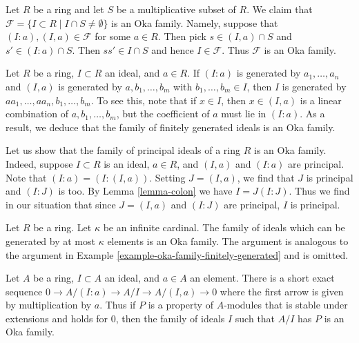 \begin{example}
\label{example-oka-family-not-meet-multiplicative-set}
Let $R$ be a ring and let $S$ be a multiplicative subset of $R$.
We claim that $\mathcal{F} = \{I \subset R \mid I \cap S \not = \emptyset\}$
is an Oka family. Namely, suppose that $(I : a), (I, a) \in \mathcal{F}$
for some $a \in R$. Then pick $s \in (I, a) \cap S$ and
$s' \in (I : a) \cap S$. Then $ss' \in I \cap S$ and hence
$I \in \mathcal{F}$. Thus $\mathcal{F}$ is an Oka family.
\end{example}

\begin{example}
\label{example-oka-family-finitely-generated}
Let $R$ be a ring, $I \subset R$ an ideal, and $a \in R$.
If $(I : a)$ is generated by $a_1, \ldots, a_n$ and $(I, a)$
is generated by $a, b_1, \ldots, b_m$ with
$b_1, \ldots, b_m \in I$, then $I$ is generated by
$aa_1, \ldots, aa_n, b_1, \ldots, b_m$.
To see this, note that if $x \in I$, then $x \in (I, a)$
is a linear combination of $a, b_1, \ldots, b_m$, but the
coefficient of $a$ must lie in $(I:a)$.
As a result, we deduce that
the family of finitely generated ideals is an Oka family.
\end{example}

\begin{example}
\label{example-oka-family-principal}
Let us show that the family of principal ideals of a ring $R$ is an Oka family.
Indeed, suppose $I \subset R$ is an ideal, $a \in R$, and $(I, a)$ and
$(I : a)$ are principal. Note that $(I : a) = (I : (I, a))$.
Setting $J = (I, a)$, we find that $J$ is principal and $(I : J)$ is too. By
Lemma \ref{lemma-colon}
we have $I = J (I : J)$.
Thus we find in our situation that since $J = (I, a)$ and $(I : J)$
are principal, $I$ is principal.
\end{example}

\begin{example}
\label{example-oka-family-bound-cardinality}
Let $R$ be a ring.
Let $\kappa$ be an infinite cardinal.
The family of ideals which can be generated by at most $\kappa$ elements
is an Oka family. The argument is analogous to the argument in
Example \ref{example-oka-family-finitely-generated}
and is omitted.
\end{example}

\begin{example}
\label{example-oka-family-property-modules}
Let $A$ be a ring, $I \subset A$ an ideal, and $a \in A$ an element.
There is a short exact sequence $0 \to A/(I : a) \to A/I \to A/(I, a) \to 0$
where the first arrow is given by multiplication by $a$. Thus if $P$
is a property of $A$-modules that is stable under extensions and holds
for $0$, then the family of ideals $I$ such that $A/I$ has $P$
is an Oka family.
\end{example}

